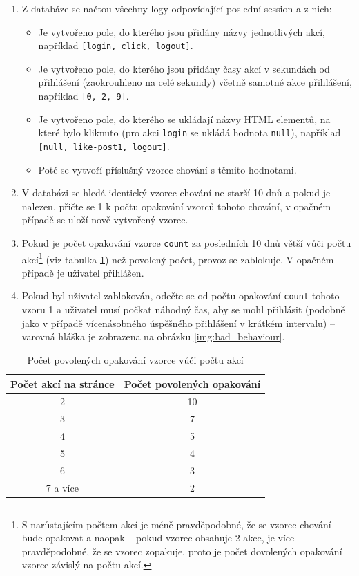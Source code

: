 \begin{enumerate}
  \item Z databáze se načtou všechny logy odpovídající poslední session a z nich:
  \begin{itemize}
      \item Je vytvořeno pole, do kterého jsou přidány názvy jednotlivých akcí, například \texttt{[login,~click,~logout]}.
      \item Je vytvořeno pole, do kterého jsou přidány časy akcí v sekundách od přihlášení (zaokrouhleno na celé sekundy) včetně samotné akce přihlášení, například \texttt{[0,~2,~9]}.
      \item Je vytvořeno pole, do kterého se ukládají názvy HTML elementů, na které bylo kliknuto (pro akci \texttt{login} se ukládá hodnota \texttt{null}), například
      \\ \texttt{[null,~like-post1,~logout]}.
      \item Poté se vytvoří příslušný vzorec chování s těmito hodnotami.
  \end{itemize}
  \item V databázi se hledá identický vzorec chování ne starší 10 dnů a pokud je nalezen, přičte se 1 k počtu opakování vzorců tohoto chování, v opačném případě se uloží nově vytvořený vzorec.
  \item Pokud je počet opakování vzorce \texttt{count} za posledních 10 dnů větší vůči počtu akcí\footnote{S narůstajícím počtem akcí je méně pravděpodobné, že se vzorec chování bude opakovat a naopak -- pokud vzorec obsahuje 2 akce, je více pravděpodobné, že se vzorec zopakuje, proto je počet dovolených opakování vzorce závislý na počtu akcí.} (viz tabulka \ref{tab:allowed_num_of_repeatings}) než povolený počet, provoz se zablokuje. V opačném případě je uživatel přihlášen.
  \item Pokud byl uživatel zablokován, odečte se od počtu opakování \texttt{count} tohoto vzoru 1 a uživatel musí počkat náhodný čas, aby se mohl přihlásit (podobně jako v případě vícenásobného úspěšného přihlášení v krátkém intervalu) -- varovná hláška je zobrazena na obrázku \ref{img:bad_behaviour}.
\end{enumerate}

\begin{table}[ht]
\centering
\label{tab:allowed_num_of_repeatings}
\begin{tabular}{|c|c|}
\hline
\textbf{Počet akcí na stránce} & \textbf{Počet povolených opakování} \\ \hline
2 & 10 \\
3 & 7 \\ 
4 & 5 \\ 
5 & 4 \\ 
6 & 3 \\ 
7 a více & 2 \\ \hline
\end{tabular}
\caption{Počet povolených opakování vzorce vůči počtu akcí}
\end{table}

